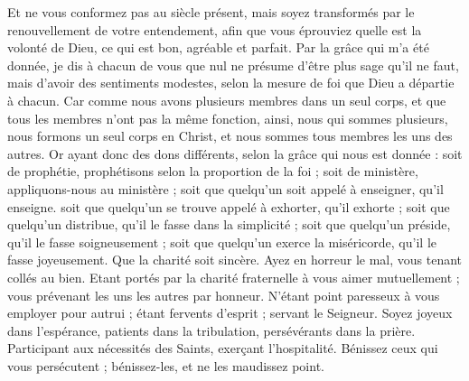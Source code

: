 \begin{multicols}{2}
Et ne vous conformez pas au siècle présent, mais soyez transformés par le renouvellement de votre entendement, afin que vous éprouviez quelle est la volonté de Dieu, ce qui est bon, agréable et parfait.
Par la grâce qui m’a été donnée, je dis à chacun de vous que nul ne présume d'être plus sage qu'il ne faut, mais d’avoir des sentiments modestes, selon la mesure de foi que Dieu a départie à chacun.
Car comme nous avons plusieurs membres dans un seul corps, et que tous les membres n'ont pas la même fonction,
ainsi, nous qui sommes plusieurs, nous formons un seul corps en Christ, et nous sommes tous membres les uns des autres.
Or ayant donc des dons différents, selon la grâce qui nous est donnée : soit de prophétie, prophétisons selon la proportion de la foi ;
soit de ministère, appliquons-nous au ministère ; soit que quelqu’un soit appelé à enseigner, qu’il enseigne.
soit que quelqu’un se trouve appelé à exhorter, qu’il exhorte ; soit que quelqu’un distribue, qu’il le fasse dans la simplicité ; soit que quelqu’un préside, qu’il le fasse soigneusement ; soit que quelqu’un exerce la miséricorde, qu’il le fasse joyeusement.
Que la charité soit sincère. Ayez en horreur le mal, vous tenant collés au bien.
Etant portés par la charité fraternelle à vous aimer mutuellement ; vous prévenant les uns les autres par honneur.
N’étant point paresseux à vous employer pour autrui ; étant fervents d’esprit ; servant le Seigneur.
Soyez joyeux dans l’espérance, patients dans la tribulation, persévérants dans la prière.
Participant aux nécessités des Saints, exerçant l’hospitalité.
Bénissez ceux qui vous persécutent ; bénissez-les, et ne les maudissez point.

\end{multicols}
